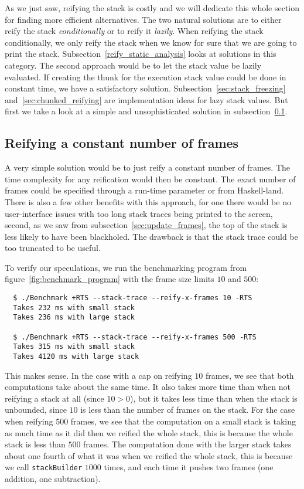 As we just saw, reifying the stack is costly and we will dedicate this whole
section for finding more efficient alternatives. The two natural solutions are to
either reify the stack \emph{conditionally} or
to reify it \emph{lazily}. When reifying the stack conditionally, we only reify the stack
when we know for sure that we are going to print the stack. Subsection~\ref{reify_static_analysis} looks at solutions in this category.
The second approach would be to let the stack value be lazily evaluated. If creating the thunk for
the execution stack value could be done in constant time, we have a
satisfactory solution. Subsection~\ref{sec:stack_freezing}
and~\ref{sec:chunked_reifying} are implementation ideas for lazy stack values.
But first we take a look at a simple and
unsophisticated solution in subsection~\ref{sec:constant_frames}.

\subsection{Reifying a constant number of frames} \label{sec:constant_frames}

A very simple solution would be to just reify a constant number of
frames. The time complexity for any reification would then be constant.
The exact number of frames could be specified through a run-time parameter
or from Haskell-land. There is also a few other benefits with this
approach, for one there would be no user-interface issues with too
long stack traces being printed to the screen, second, as we saw from subsection~\ref{sec:update_frames}, the top of the stack is less likely to have
been blackholed. The drawback is that the stack trace could
be too truncated to be useful.

To verify our speculations, we run the benchmarking program from
figure~\ref{fig:benchmark_program} with the frame size limits $10$ and $500$:

\begin{verbatim}
  $ ./Benchmark +RTS --stack-trace --reify-x-frames 10 -RTS
  Takes 232 ms with small stack
  Takes 236 ms with large stack

  $ ./Benchmark +RTS --stack-trace --reify-x-frames 500 -RTS
  Takes 315 ms with small stack
  Takes 4120 ms with large stack
\end{verbatim}

This makes sense. In the case with a cap on reifying $10$ frames, we see
that both computations take about the same time. It also takes more time
than when not reifying a stack at all (since $10 > 0$), but it takes
less time than when the stack is unbounded, since $10$ is less than the
number of frames on the stack. For the case when reifying $500$ frames,
we see that the computation on a small stack is taking as much time as
it did then we reified the whole stack, this is because the whole stack
is less than $500$ frames. The computation done with the larger stack takes
about one fourth of what it was when we reified the whole stack, this is because
we call \texttt{stackBuilder} $1000$ times, and each time it pushes two frames
(one addition, one subtraction).

